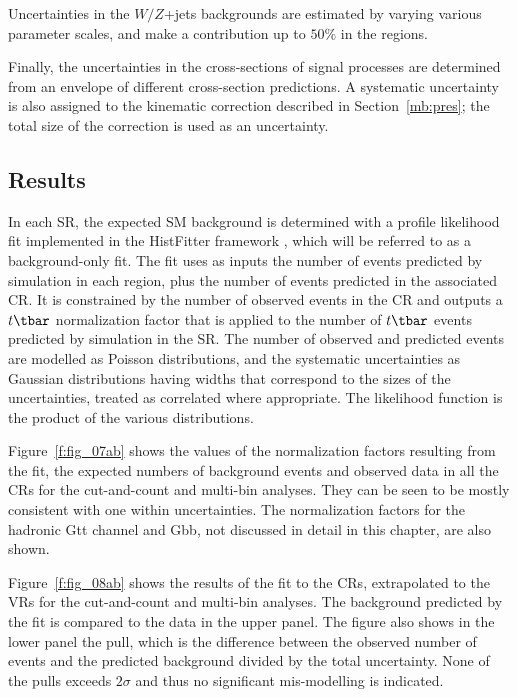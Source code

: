 Uncertainties in the $W/Z$+jets backgrounds are estimated by varying various
parameter scales, and make a contribution up to $50\%$ in the regions.

Finally, the uncertainties in the cross-sections of signal processes are
determined from an envelope of different cross-section predictions. A
systematic uncertainty is also assigned to the kinematic correction described
in Section~\ref{mb:pres}; the total size of the correction is used as an
uncertainty.

\subsection{Results}\label{mbresul}

In each SR, the expected SM background is determined with a profile likelihood
fit \cite{Cowan:2010js} implemented in the HistFitter framework \cite{HFpaper},
which will be referred to as a background-only fit. The fit uses as inputs the
number of events predicted by simulation in each region, plus the number of
events predicted in the associated CR. It is constrained by the number of
observed events in the CR and outputs a $t\tbar$ normalization factor that is
applied to the number of $t\tbar$ events predicted by simulation in the SR. The
number of observed and predicted events are modelled as Poisson distributions,
and the systematic uncertainties as Gaussian distributions having widths that
correspond to the sizes of the uncertainties, treated as correlated where
appropriate. The likelihood function is the product of the various
distributions.

Figure~\ref{f:fig_07ab} shows the values of the normalization factors resulting
from the fit, the expected numbers of background events and observed data in
all the CRs for the cut-and-count and multi-bin analyses. They can be seen to
be mostly consistent with one within uncertainties. The normalization factors
for the hadronic Gtt channel and Gbb, not discussed in detail in this chapter,
are also shown.


Figure~\ref{f:fig_08ab} shows the results of the fit to the CRs, extrapolated
to the VRs for the cut-and-count and multi-bin analyses. The background
predicted by the fit is compared to the data in the upper panel. The figure
also shows in the lower panel the pull, which is the difference between the
observed number of events and the predicted background divided by the total
uncertainty. None of the pulls exceeds $2\sigma$ and thus no significant
mis-modelling is indicated.

